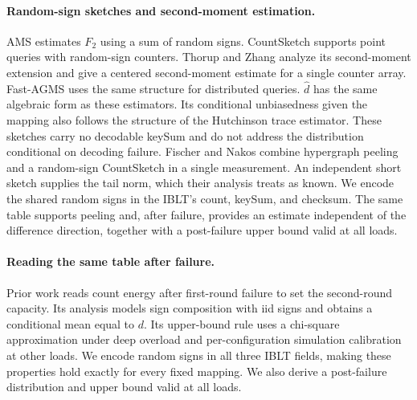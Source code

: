 \paragraph{Random-sign sketches and second-moment estimation.} AMS\cite{alon1999spacecomplexity} estimates $F_2$ using a sum of random signs. CountSketch\cite{charikar2004countsketch} supports point queries with random-sign counters. Thorup and Zhang\cite{thorup2004tabulation} analyze its second-moment extension and give a centered second-moment estimate for a single counter array. Fast-AGMS\cite{cormode2005fastagms} uses the same structure for distributed queries. $\widehat d$ has the same algebraic form as these estimators. Its conditional unbiasedness given the mapping also follows the structure of the Hutchinson trace estimator\cite{hutchinson1990trace}. These sketches carry no decodable keySum and do not address the distribution conditional on decoding failure. Fischer and Nakos\cite{fischer2025sparse} combine hypergraph peeling and a random-sign CountSketch in a single measurement. An independent short sketch supplies the tail norm, which their analysis treats as known. We encode the shared random signs in the IBLT's count, keySum, and checksum. The same table supports peeling and, after failure, provides an estimate independent of the difference direction, together with a post-failure upper bound valid at all loads.

\paragraph{Reading the same table after failure.} Prior work\cite{wu2026selfsizing} reads count energy after first-round failure to set the second-round capacity. Its analysis models sign composition with iid signs and obtains a conditional mean equal to $d$. Its upper-bound rule uses a chi-square approximation under deep overload and per-configuration simulation calibration at other loads. We encode random signs in all three IBLT fields, making these properties hold exactly for every fixed mapping. We also derive a post-failure distribution and upper bound valid at all loads.

